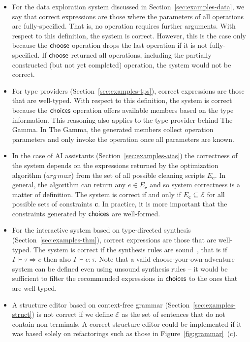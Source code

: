 \documentclass[ a4paper,UKenglish,cleveref, autoref, thm-restate]{lipics-v2021}
\newcommand{\ident}[1]{\textsf{#1}}
\newcommand{\select}{\textnormal{\ident{choose}}}
\newcommand{\choices}{\textnormal{\ident{choices}}}
\begin{document}
\begin{itemize}
\setlength{\itemsep}{5pt}
\item For the data exploration system discussed in Section~\ref{sec:examples-data}, we say that
  correct expressions are those where the parameters of all operations are fully-specified.
  That is, no operation requires further arguments. With respect to this definition,
  the system is correct. However, this is the case only because the $\select$ operation drops the last
  operation if it is not fully-specified. If $\select$ returned all operations, including the
  partially constructed (but not yet completed) operation, the system would not be correct.

\item For type providers (Section~\ref{sec:examples-tps}), correct expressions are those that
  are well-typed. With respect to this definition, the system is correct because the $\choices$
  operation offers available members based on the type information. This reasoning also applies to the
  type provider behind The Gamma. In The Gamma, the generated members collect operation parameters
  and only invoke the operation once all parameters are known.

\item In the case of AI assistants (Section~\ref{sec:examples-aias}) the correctness of the system
  depends on the expressions returned by the optimization algorithm ($\mathit{arg\,max}$) from the
  set of all possible cleaning scripts $E_{\boldsymbol{c}}$. In general, the algorithm can return
  any $e\in E_{\boldsymbol{c}}$ and so system correctness is a matter of definition. The system
  is correct if and only if $E_{\boldsymbol{c}}\subseteq\mathcal{E}$ for all possible sets of
  constraints $\boldsymbol{c}$. In practice, it is more important that the constraints generated
  by $\choices$ are well-formed.

\item For the interactive system based on type-directed synthesis (Section~\ref{sec:examples-thm}),
  correct expressions are those that are well-typed. The system is correct if the synthesis rules
  are sound~\cite{osera-2015-synthesis}, that is if $\Gamma \vdash \tau \Rightarrow e$ then also
  $\Gamma \vdash e : \tau$. Note that a valid choose-your-own-adventure system can be defined
  even using unsound synthesis rules -- it would be sufficient to filter the recommended
  expressions in $\choices$ to the ones that are well-typed.

\item A structure editor based on context-free grammar (Section~\ref{sec:examples-struct})
  is not correct if we define $\mathcal{E}$ as the set of sentences that do not contain
  non-terminals. A correct structure editor could be implemented if it was based
  solely on refactorings such as those in Figure~\ref{fig:grammar}~(c).
\end{itemize}
\end{document}
